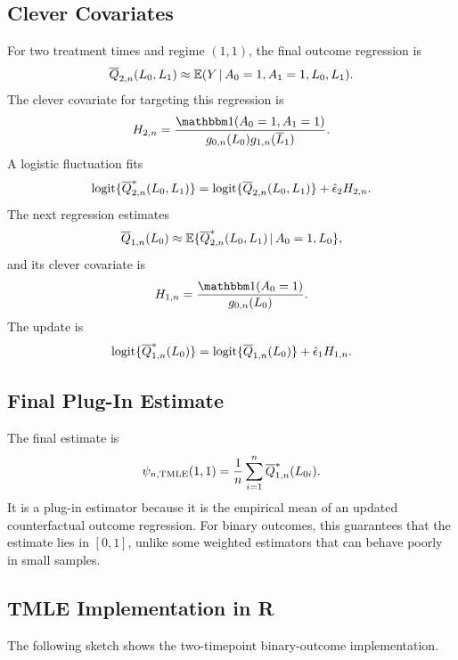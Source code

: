 \subsection{Clever Covariates}

For two treatment times and regime $(1,1)$, the final outcome regression is
\[
  \overline{Q}_{2,n}(L_0,L_1)\approx \mathbb{E}(Y\,\vert\, A_0=1,A_1=1,L_0,L_1).
\]
The clever covariate for targeting this regression is
\[
  H_{2,n}=\frac{\ind(A_0=1,A_1=1)}
  {g_{0,n}(L_0)g_{1,n}(\Lbar_1)}.
\]
A logistic fluctuation fits
\[
  \operatorname{logit}\{\overline{Q}_{2,n}^*(L_0,L_1)\}
  =
  \operatorname{logit}\{\overline{Q}_{2,n}(L_0,L_1)\}
  +\hat\epsilon_2 H_{2,n}.
\]
The next regression estimates
\[
  \overline{Q}_{1,n}(L_0)\approx
  \mathbb{E}\{\overline{Q}_{2,n}^*(L_0,L_1)\,\vert\, A_0=1,L_0\},
\]
and its clever covariate is
\[
  H_{1,n}=\frac{\ind(A_0=1)}{g_{0,n}(L_0)}.
\]
The update is
\[
  \operatorname{logit}\{\overline{Q}_{1,n}^*(L_0)\}
  =
  \operatorname{logit}\{\overline{Q}_{1,n}(L_0)\}+\hat\epsilon_1H_{1,n}.
\]

\subsection{Final Plug-In Estimate}

The final estimate is
\[
  \psi_{n,\operatorname{TMLE}}(1,1)=\frac{1}{n}\sum_{i=1}^n\overline{Q}_{1,n}^*(L_{0i}).
\]
It is a plug-in estimator because it is the empirical mean of an updated
counterfactual outcome regression. For binary outcomes, this guarantees that the
estimate lies in $[0,1]$, unlike some weighted estimators that can behave poorly
in small samples.

\subsection{TMLE Implementation in R}

The following sketch shows the two-timepoint binary-outcome implementation.

